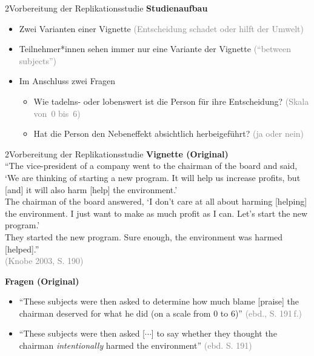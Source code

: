 \documentclass[xcolor=table,9pt,aspectratio=169]{beamer}
\begin{document}
\begin{frame}{\vspace*{10mm}2\hspace*{1em}Vorbereitung der Replikationsstudie}
\textbf{Studienaufbau}\\
\begin{itemize}
   \item Zwei Varianten einer Vignette \textcolor{gray}{(Entscheidung schadet oder hilft der Umwelt)}
   \item Teilnehmer*innen sehen immer nur eine Variante der Vignette \textcolor{gray}{(\enquote{between subjects})}
   \item Im Anschluss zwei Fragen
   \begin{itemize}
      \item Wie tadelns- oder lobenswert ist die Person für ihre Entscheidung? \textcolor{gray}{(Skala von~0 bis~6)}
      \item Hat die Person den Nebeneffekt absichtlich herbeigeführt? \textcolor{gray}{(ja oder nein)}
   \end{itemize}
\end{itemize}
\end{frame}


\begin{frame}{\vspace*{10mm}2\hspace*{1em}Vorbereitung der Replikationsstudie}
\textbf{Vignette (Original)}\\
\smallskip
\enquote{The vice-president of a company went to the chairman of the board and said, \enquote{We are thinking of starting a new program. It will help us increase profits, but \textcolor{blue2}{[and]} it will also harm \textcolor{blue2}{[help]} the environment.}\\\vspace{0.25em}
The chairman of the board answered, \enquote{I don't care at all about harming \textcolor{blue2}{[helping]} the environment. I just want to make as much profit as I can. Let's start the new program.}\\\vspace{0.25em}
They started the new program. Sure enough, the environment was harmed \textcolor{blue2}{[helped]}.}\\
\textcolor{gray}{(Knobe 2003, S. 190)}

\bigskip
\textbf{Fragen (Original)}\\
\begin{itemize}
   \item \enquote{These subjects were then asked to determine how much blame \textcolor{blue2}{[praise]} the chairman deserved for what he did (on a scale from 0 to 6)} \textcolor{gray}{(ebd., S. 191\,f.)}
   \item \enquote{These subjects were then asked [$\cdots$] to say whether they thought the chairman \textit{intentionally} harmed the environment} \textcolor{gray}{(ebd. S. 191)}
\end{itemize}
\end{frame}
\end{document}
